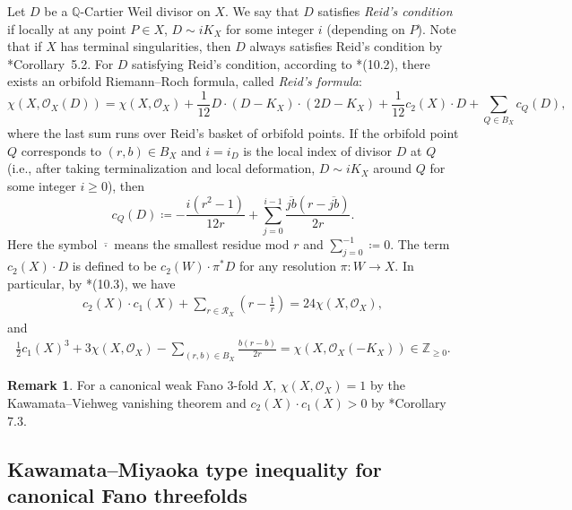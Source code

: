 \documentclass[12pt,twoside]{amsart}
\theoremstyle{definition}
\newtheorem{rem}[thm]{Remark}
\begin{document}
Let $D$ be a $\mathbb{Q}$-Cartier Weil divisor on $X$. We say that $D$ satisfies {\it Reid's condition} if locally at any point $P\in X$, $D\sim iK_X$ for some integer $i$ (depending on $P$). Note that if $X$ has terminal singularities, then $D$ always satisfies Reid's condition by \cite{kawamata-crepant}*{Corollary~5.2}. For $D$ satisfying Reid's condition, according to \cite{reid}*{(10.2)}, there exists an orbifold Riemann--Roch formula, called \emph{Reid's formula}:
\begin{equation}\label{eq.reidformula}
    \chi(X, \mathcal O_X(D))=\chi(X, \mathcal O_X)+\frac{1}{12}D\cdot (D-K_X)\cdot (2D-K_X)+\frac{1}{12}c_2(X)\cdot D+\sum_{Q\in B_X}c_Q(D),
\end{equation}
where the last sum runs over Reid’s basket of orbifold points. If the orbifold point $Q$ corresponds to $(r,b)\in B_X$ and $i= i_D$ is the local index of divisor $D$ at $Q$ (i.e., after taking terminalization and local deformation, $D\sim iK_X$ around $Q$ for some integer $i\geq 0$), then 
\[
    c_Q(D)\coloneq -\frac{i(r^2-1)}{12r}+\sum_{j=0}^{i-1}\frac{\overline{jb}(r-\overline{jb})}{2r}.
\]
Here the symbol $\overline{\cdot}$ means the smallest residue mod $r$ and $\sum_{j=0}^{-1}\coloneq 0$. The term $c_2(X)\cdot D$ is defined to be
$c_2(W)\cdot \pi^*D$ for any resolution $\pi\colon W\to X$. In particular, by \cite{reid}*{(10.3)}, we have
\begin{align}\label{eq.range}
    c_2(X)\cdot c_1(X) + \sum_{r\in \mathcal{R}_X} \left(r-\frac{1}{r}\right)=24\chi(X, \mathcal O_X),
\end{align}
and 
\begin{align}\label{eq.RR-Fano}
    \frac{1}{2}c_1(X)^3+3\chi(X, \mathcal O_X)- \sum_{(r,b)\in B_X}\frac{b(r-b)}{2r}= \chi(X,\mathcal{O}_X(-K_X))\in \mathbb Z_{\geq 0}.
\end{align}

\begin{rem}\label{rem.posofc2}
    For a canonical weak Fano $3$-fold $X$, $\chi(X, \mathcal{O}_X)=1$ by the Kawamata--Viehweg vanishing theorem and $c_2(X)\cdot c_1(X)>0$ by \cite{ijl}*{Corollary 7.3}. %
\end{rem}

\subsection{Kawamata--Miyaoka type inequality for canonical Fano threefolds}\label{sub.KMineq}
\end{document}
